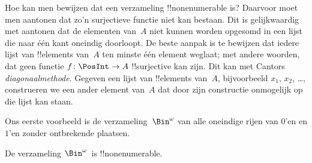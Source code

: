 \documentclass[openany]{memoir}
\begin{document}
Hoe kan men bewijzen dat een verzameling !!{nonenumerable} is? Daarvoor
moet men aantonen dat zo'n surjectieve functie niet kan bestaan. Dit is
gelijkwaardig met aantonen dat de elementen van~$A$ niet kunnen worden
opgesomd in een lijst die naar één kant oneindig doorloopt. De beste
aanpak is te bewijzen dat iedere lijst van !!{element}s van~$A$ ten
minste één element weglaat; met andere woorden, dat geen functie
$f\colon \PosInt \to A$ !!{surjective} kan zijn. Dit kan met Cantors
\emph{diagonaalmethode}. Gegeven een lijst van !!{element}s van~$A$,
bijvoorbeeld $x_1$, $x_2$, \dots, construeren we een ander element
van~$A$ dat door zijn constructie onmogelijk op die lijst kan staan.

Ons eerste voorbeeld is de verzameling~$\Bin^\omega$ van alle oneindige
rijen van $0$'en en $1$'en zonder ontbrekende plaatsen.

\begin{thm}
De verzameling $\Bin^\omega$~is !!{nonenumerable}.
\end{thm}
\end{document}
